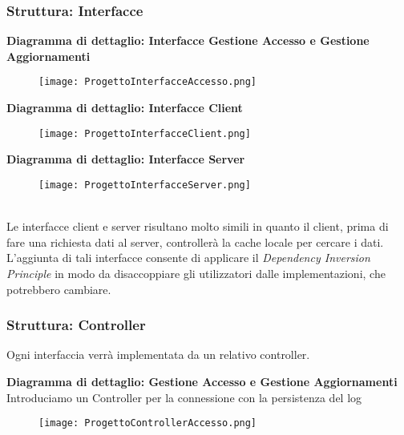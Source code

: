 \subsubsection{Struttura: Interfacce}

\textbf{Diagramma di dettaglio: Interfacce Gestione Accesso e Gestione Aggiornamenti}
\begin{figure}[h!]
    \begin{center}
        \texttt{[image: ProgettoInterfacceAccesso.png]}
    \end{center}
\end{figure}

\textbf{Diagramma di dettaglio: Interfacce Client}
\begin{figure}[h!]
    \begin{center}
        \texttt{[image: ProgettoInterfacceClient.png]}
    \end{center}
\end{figure}

\textbf{Diagramma di dettaglio: Interfacce Server}
\begin{figure}[h!]
    \begin{center}
        \texttt{[image: ProgettoInterfacceServer.png]}
    \end{center}
\end{figure}\\

Le interfacce client e server risultano molto simili in quanto il client, prima di fare una richiesta dati al server, controllerà la cache locale per cercare i dati.
L'aggiunta di tali interfacce consente di applicare il \textit{Dependency Inversion Principle}
in modo da disaccoppiare gli utilizzatori dalle implementazioni, che potrebbero cambiare.

\clearpage

\subsubsection{Struttura: Controller}

Ogni interfaccia verrà implementata da un relativo controller.
\vspace{1em}

\textbf{Diagramma di dettaglio: Gestione Accesso e Gestione Aggiornamenti}
\\Introduciamo un Controller per la connessione con la persistenza del log
\begin{figure}[h!]
    \begin{center}
        \texttt{[image: ProgettoControllerAccesso.png]}
    \end{center}
\end{figure}

